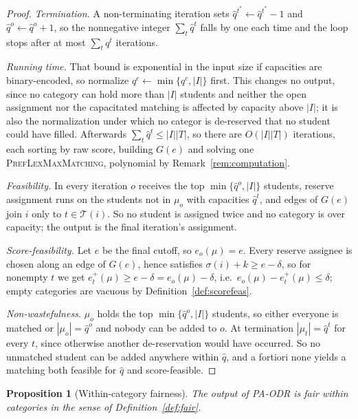 \documentclass[a4paper,twoside]{article}
\newtheorem{proposition}{Proposition}
\theoremstyle{definition}
\renewcommand{\T}{\mathcal{T}}
\begin{document}
\begin{proof}
\emph{Termination.} A non-terminating iteration sets $\hat q^{t^\ast}\gets\hat q^{t^\ast}-1$ and $\hat q^o\gets\hat q^o+1$, so the nonnegative integer $\sum_{t}\hat q^t$ falls by one each time and the loop stops after at most $\sum_t q^t$ iterations.

\emph{Running time.} That bound is exponential in the input size if capacities are binary-encoded, so normalize $q^c\gets\min\{q^c,|I|\}$ first. This changes no output, since no category can hold more than $|I|$ students and neither the open assignment nor the capacitated matching is affected by capacity above $|I|$; it is also the normalization under which no categor is de-reserved that no student could have filled. Afterwards $\sum_t\hat q^t\le|I||T|$, so there are $O(|I||T|)$ iterations, each sorting by raw score, building $G(e)$ and solving one \textsc{PrefLexMaxMatching}, polynomial by Remark~\ref{rem:computation}.

\emph{Feasibility.} In every iteration $o$ receives the top $\min\{\hat q^o,|I|\}$ students, reserve assignment runs on the students not in $\mu_o$ with capacities $\hat q^t$, and edges of $G(e)$ join $i$ only to $t\in\T(i)$. So no student is assigned twice and no category is over capacity; the output is the final iteration's assignment.

\emph{Score-feasibility.} Let $e$ be the final cutoff, so $e_o(\mu)=e$. Every reserve assignee is chosen along an edge of $G(e)$, hence satisfies $\sigma(i)+k\ge e-\delta$, so for nonempty $t$ we get $e_t^+(\mu)\ge e-\delta=e_o(\mu)-\delta$, i.e.\ $e_o(\mu)-e_t^+(\mu)\le\delta$; empty categories are vacuous by Definition~\ref{def:scorefeas}.

\emph{Non-wastefulness.} $\mu_o$ holds the top $\min\{\hat q^o,|I|\}$ students, so either everyone is matched or $|\mu_o|=\hat q^o$ and nobody can be added to $o$. At termination $|\mu_t|=\hat q^t$ for every $t$, since otherwise another de-reservation would have occurred. So no unmatched student can be added anywhere within $\hat q$, and a fortiori none yields a matching both feasible for $\hat q$ and score-feasible.
\end{proof}

\begin{proposition}[Within-category fairness]
\label{prop:paodr-fair}
The output of PA-ODR is fair within categories in the sense of Definition~\ref{def:fair}.
\end{proposition}
\end{document}
